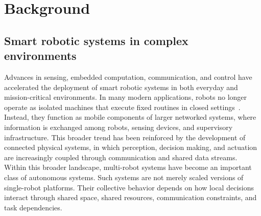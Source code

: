\section{Background}
\label{sec:ch01_background}

\subsection{Smart robotic systems in complex environments}
\label{sec:ch01:background:systems}


Advances in sensing, embedded computation, communication, and control have
accelerated the deployment of smart robotic systems in both everyday and
mission-critical environments. In many modern applications, robots no longer
operate as isolated machines that execute fixed routines in closed settings~\citep{atzori2010internet}.
Instead, they function as mobile components of larger networked systems, where
information is exchanged among robots, sensing devices, and supervisory
infrastructure. This broader trend has been reinforced by the development of
connected physical systems, in which perception, decision making, and actuation
are increasingly coupled through communication and shared data
streams.
Within this broader landscape, multi-robot systems have become an important
class of autonomous systems. 
Such systems are not merely
scaled versions of single-robot platforms. Their collective behavior depends on
how local decisions interact through shared space, shared resources,
communication constraints, and task dependencies. 



